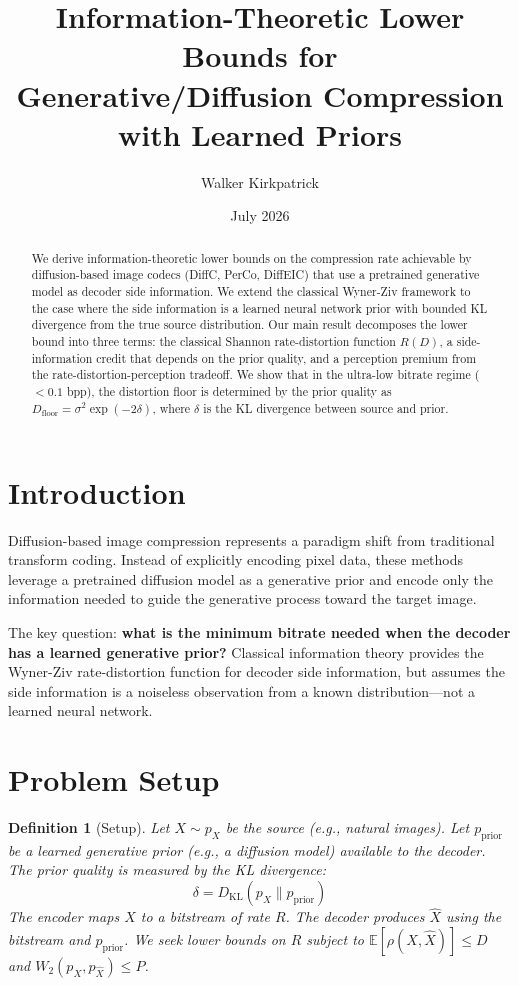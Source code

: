 \documentclass[11pt]{article}
\title{\textbf{Information-Theoretic Lower Bounds for\\
Generative/Diffusion Compression with Learned Priors}}
\author{Walker Kirkpatrick}
\date{July 2026}
\newtheorem{definition}[theorem]{Definition}
\begin{document}
\maketitle

\begin{abstract}
We derive information-theoretic lower bounds on the compression rate achievable by diffusion-based image codecs (DiffC, PerCo, DiffEIC) that use a pretrained generative model as decoder side information. We extend the classical Wyner-Ziv framework to the case where the side information is a learned neural network prior with bounded KL divergence from the true source distribution. Our main result decomposes the lower bound into three terms: the classical Shannon rate-distortion function $R(D)$, a side-information credit that depends on the prior quality, and a perception premium from the rate-distortion-perception tradeoff. We show that in the ultra-low bitrate regime ($< 0.1$ bpp), the distortion floor is determined by the prior quality as $D_{\text{floor}} = \sigma^2 \exp(-2\delta)$, where $\delta$ is the KL divergence between source and prior.
\end{abstract}

\section{Introduction}

Diffusion-based image compression represents a paradigm shift from traditional transform coding. Instead of explicitly encoding pixel data, these methods leverage a pretrained diffusion model as a generative prior and encode only the information needed to guide the generative process toward the target image.

The key question: \textbf{what is the minimum bitrate needed when the decoder has a learned generative prior?} Classical information theory provides the Wyner-Ziv rate-distortion function for decoder side information, but assumes the side information is a noiseless observation from a known distribution---not a learned neural network.

\section{Problem Setup}

\begin{definition}[Setup]
Let $X \sim p_X$ be the source (e.g., natural images). Let $p_{\text{prior}}$ be a learned generative prior (e.g., a diffusion model) available to the decoder. The prior quality is measured by the KL divergence:
\[
\delta = D_{\mathrm{KL}}(p_X \| p_{\text{prior}})
\]
The encoder maps $X$ to a bitstream of rate $R$. The decoder produces $\hat{X}$ using the bitstream and $p_{\text{prior}}$. We seek lower bounds on $R$ subject to $\mathbb{E}[\rho(X, \hat{X})] \leq D$ and $W_2(p_X, p_{\hat{X}}) \leq P$.
\end{definition}
\end{document}
